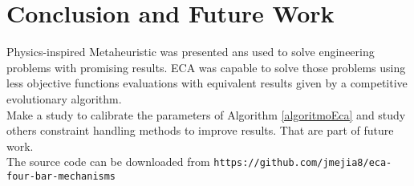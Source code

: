 \documentclass[12pt,letterpape]{article}
\begin{document}
\section{Conclusion and Future Work} %
\label{sec:conclusion_and_future_work}

Physics-inspired Metaheuristic was presented ans used to solve engineering 
problems with promising results. ECA was capable to solve those problems using
less objective functions evaluations with equivalent results given by a 
competitive evolutionary algorithm.\\

Make a study to calibrate the parameters of Algorithm \ref{algoritmoEca} and study
others constraint handling methods to improve results. That are part of future work.\\

\noindent
The source code can be downloaded from
\verb|https://github.com/jmejia8/eca-four-bar-mechanisms|




\end{document}
